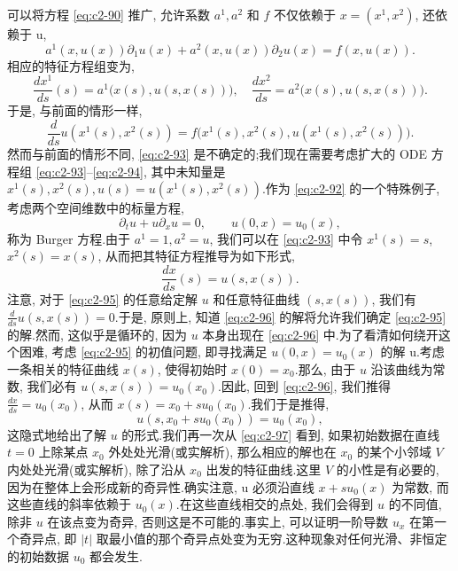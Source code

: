 可以将方程 \eqref{eq:c2-90} 推广, 允许系数 $a^{1}, a^{2}$ 和 $f$ 不仅依赖于 $x = (x^{1}, x^{2})$, 还依赖于 u,
\begin{equation}
a^{1}(x, u(x)) \partial_{1} u(x) + a^{2}(x, u(x)) \partial_{2} u(x) = f(x, u(x)). \label{eq:c2-92}
\end{equation}
相应的特征方程组变为,
\begin{equation}
\frac{d x^{1}}{d s}(s) = a^{1}\bigl(x(s), u(s, x(s))\bigr), \quad \frac{d x^{2}}{d s} = a^{2}\bigl(x(s), u(s, x(s))\bigr). \label{eq:c2-93}
\end{equation}
于是, 与前面的情形一样,
\begin{equation}
\frac{d}{d s} u(x^{1}(s), x^{2}(s)) = f\bigl(x^{1}(s), x^{2}(s), u(x^{1}(s), x^{2}(s))\bigr). \label{eq:c2-94}
\end{equation}
然而与前面的情形不同, \eqref{eq:c2-93} 是不确定的;我们现在需要考虑扩大的 ODE 方程组 \eqref{eq:c2-93}–\eqref{eq:c2-94}, 其中未知量是 $x^{1}(s), x^{2}(s), u(s) = u(x^{1}(s), x^{2}(s))$.作为 \eqref{eq:c2-92} 的一个特殊例子, 考虑两个空间维数中的标量方程,
\begin{equation}
\partial_{t} u + u \partial_{x} u = 0, \qquad u(0, x) = u_{0}(x), \label{eq:c2-95}
\end{equation}
称为 Burger 方程.由于 $a^{1} = 1, a^{2} = u$, 我们可以在 \eqref{eq:c2-93} 中令 $x^{1}(s) = s$, $x^{2}(s) = x(s)$, 从而把其特征方程推导为如下形式,
\begin{equation}
\frac{d x}{d s}(s) = u(s, x(s)). \label{eq:c2-96}
\end{equation}
注意, 对于 \eqref{eq:c2-95} 的任意给定解 $u$ 和任意特征曲线 $(s, x(s))$, 我们有 $\frac{d}{d s} u(s, x(s)) = 0$.于是, 原则上, 知道 \eqref{eq:c2-96} 的解将允许我们确定 \eqref{eq:c2-95} 的解.然而, 这似乎是循环的, 因为 $u$ 本身出现在 \eqref{eq:c2-96} 中.为了看清如何绕开这个困难, 考虑 \eqref{eq:c2-95} 的初值问题, 即寻找满足 $u(0, x) = u_{0}(x)$ 的解 u.考虑一条相关的特征曲线 $x(s)$, 使得初始时 $x(0) = x_{0}$.那么, 由于 $u$ 沿该曲线为常数, 我们必有 $u(s, x(s)) = u_{0}(x_{0})$.因此, 回到 \eqref{eq:c2-96}, 我们推得 $\frac{d x}{d s} = u_{0}(x_{0})$, 从而 $x(s) = x_{0} + s u_{0}(x_{0})$.我们于是推得,
\begin{equation}
u(s, x_{0} + s u_{0}(x_{0})) = u_{0}(x_{0}), \label{eq:c2-97}
\end{equation}
这隐式地给出了解 $u$ 的形式.我们再一次从 \eqref{eq:c2-97} 看到, 如果初始数据在直线 $t = 0$ 上除某点 $x_{0}$ 外处处光滑(或实解析), 那么相应的解也在 $x_{0}$ 的某个小邻域 $V$ 内处处光滑(或实解析), 除了沿从 $x_{0}$ 出发的特征曲线.这里 $V$ 的小性是有必要的, 因为在整体上会形成新的奇异性.确实注意, u 必须沿直线 $x + s u_{0}(x)$ 为常数, 而这些直线的斜率依赖于 $u_{0}(x)$.在这些直线相交的点处, 我们会得到 $u$ 的不同值, 除非 $u$ 在该点变为奇异, 否则这是不可能的.事实上, 可以证明一阶导数 $u_{x}$ 在第一个奇异点, 即 $|t|$ 取最小值的那个奇异点处变为无穷.这种现象对任何光滑、非恒定的初始数据 $u_{0}$ 都会发生.

